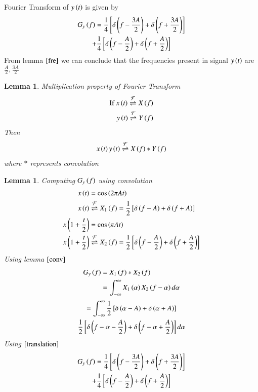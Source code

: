 \documentclass[journal,12pt,twocolumn]{IEEEtran}
\newtheorem{lemma}[theorem]{Lemma}
\begin{document}
Fourier Transform of $y\left(t\right)$ is given by
\begin{multline}
    G_y\left(f\right)=\frac{1}{4}{}\left[\delta\left(f-\frac{3A}{2}\right)+\delta\left(f+\frac{3A}{2}\right)\right]\\+\frac{1}{4}{}\left[\delta\left(f-\frac{A}{2}\right)+\delta\left(f+\frac{A}{2}\right)\right]
\end{multline}
From lemma $\ref{fre}$ we can conclude that the frequencies present in signal $y\left(t\right)$ are $\frac{A}{2},\frac{3A}{2}$
\begin{lemma}{Multiplication property of Fourier Transform}\label{conv}
\begin{align}
    \text{If } x\left(t\right) \overset{\mathcal{F}}{ \rightleftharpoons} X\left(f\right) \\
    y\left(t\right) \overset{\mathcal{F}}{ \rightleftharpoons} Y\left(f\right)
\end{align}
Then
\begin{align}
   x\left(t\right)y\left(t\right) \overset{\mathcal{F}}{ \rightleftharpoons}  X\left(f\right) \ast Y\left(f\right)
\end{align}
where $\ast$ represents convolution
\end{lemma}
\begin{lemma}{Computing $G_y\left(f\right)$ using convolution}
\begin{align}
    x\left(t\right)&=\cos{\ensuremath{\left(2\pi At\right)}}\\
    x\left(t\right)& \overset{\mathcal{F}}{ \rightleftharpoons} X_1\left(f\right)=\frac{1}{2}{}\left[\delta\left(f-A\right)+\delta\left(f+A\right)\right]\\
    x\left(1+\frac{t}{2}\right)&=\cos{\ensuremath{\left(\pi At\right)}}\\
    x\left(1+\frac{t}{2}\right)& \overset{\mathcal{F}}{ \rightleftharpoons} X_2\left(f\right)=\frac{1}{2}{}\left[\delta\left(f-\frac{A}{2}\right)+\delta\left(f+\frac{A}{2}\right)\right]
\end{align}
Using lemma $\ref{conv}$ 
\begin{align}
    G_y\left(f\right)&=X_1\left(f\right)\ast X_2\left(f\right)\\
    &=\int_{-\infty}^{\infty}X_1\left(\alpha\right)X_2\left(f-\alpha\right)d\alpha
\end{align}
\begin{multline}
    =\int_{-\infty}^{\infty}\frac{1}{2}{}\left[\delta\left(\alpha-A\right)+\delta\left(\alpha+A\right)\right]\\\frac{1}{2}{}\left[\delta\left(f-\alpha-\frac{A}{2}\right)+\delta\left(f-\alpha+\frac{A}{2}\right)\right] d\alpha
\end{multline}
Using $\eqref{translation}$ 
\begin{multline}
    G_y\left(f\right)=\frac{1}{4}{}\left[\delta\left(f-\frac{3A}{2}\right)+\delta\left(f+\frac{3A}{2}\right)\right]\\+\frac{1}{4}{}\left[\delta\left(f-\frac{A}{2}\right)+\delta\left(f+\frac{A}{2}\right)\right]
\end{multline}
\end{lemma}
\end{document}
